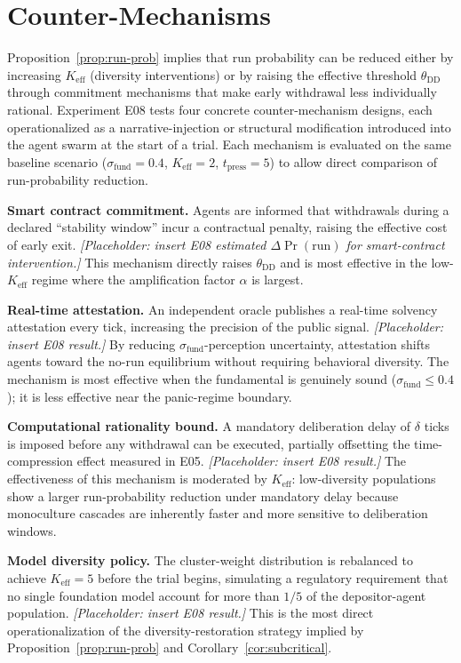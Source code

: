 \section{Counter-Mechanisms}
\label{sec:counter}

Proposition~\ref{prop:run-prob} implies that run probability can be reduced either by increasing $K_{\text{eff}}$ (diversity interventions) or by raising the effective threshold $\theta_{\text{DD}}$ through commitment mechanisms that make early withdrawal less individually rational. Experiment E08 tests four concrete counter-mechanism designs, each operationalized as a narrative-injection or structural modification introduced into the agent swarm at the start of a trial. Each mechanism is evaluated on the same baseline scenario ($\sigma_{\text{fund}} = 0.4$, $K_{\text{eff}} = 2$, $t_{\text{press}} = 5$) to allow direct comparison of run-probability reduction.

\textbf{Smart contract commitment.} Agents are informed that withdrawals during a declared ``stability window'' incur a contractual penalty, raising the effective cost of early exit. \textit{[Placeholder: insert E08 estimated $\Delta\Pr(\text{run})$ for smart-contract intervention.]} This mechanism directly raises $\theta_{\text{DD}}$ and is most effective in the low-$K_{\text{eff}}$ regime where the amplification factor $\alpha$ is largest.

\textbf{Real-time attestation.} An independent oracle publishes a real-time solvency attestation every tick, increasing the precision of the public signal. \textit{[Placeholder: insert E08 result.]} By reducing $\sigma_{\text{fund}}$-perception uncertainty, attestation shifts agents toward the no-run equilibrium without requiring behavioral diversity. The mechanism is most effective when the fundamental is genuinely sound ($\sigma_{\text{fund}} \leq 0.4$); it is less effective near the panic-regime boundary.

\textbf{Computational rationality bound.} A mandatory deliberation delay of $\delta$ ticks is imposed before any withdrawal can be executed, partially offsetting the time-compression effect measured in E05. \textit{[Placeholder: insert E08 result.]} The effectiveness of this mechanism is moderated by $K_{\text{eff}}$: low-diversity populations show a larger run-probability reduction under mandatory delay because monoculture cascades are inherently faster and more sensitive to deliberation windows.

\textbf{Model diversity policy.} The cluster-weight distribution is rebalanced to achieve $K_{\text{eff}} = 5$ before the trial begins, simulating a regulatory requirement that no single foundation model account for more than $1/5$ of the depositor-agent population. \textit{[Placeholder: insert E08 result.]} This is the most direct operationalization of the diversity-restoration strategy implied by Proposition~\ref{prop:run-prob} and Corollary~\ref{cor:subcritical}.

